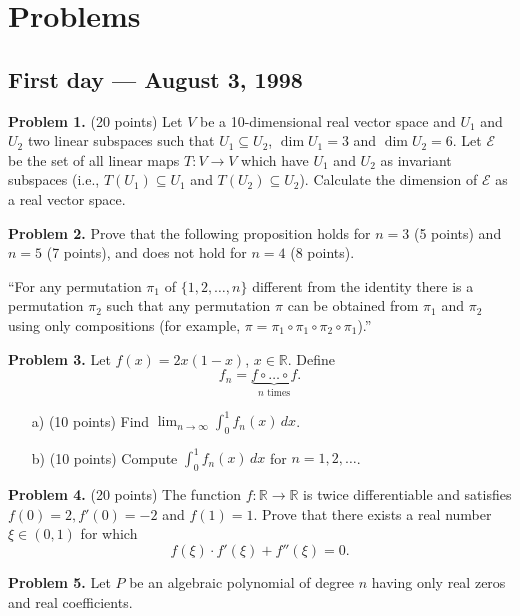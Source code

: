 \documentclass{article}
\begin{document}
\pagestyle{plain}

\section*{Problems}

\subsection*{First day — August 3, 1998}

\textbf{Problem 1.} (20 points)
Let $V$ be a 10-dimensional real vector space and $U_1$ and $U_2$ two linear subspaces
such that $U_1 \subseteq U_2$, $\dim{U_1} = 3$ and $\dim{U_2} = 6$.
Let $\mathcal{E}$ be the set of all linear maps $T : V \rightarrow V$
which have $U_1$ and $U_2$ as invariant subspaces (i.e., $T(U_1) \subseteq U_1$
and $T(U_2) \subseteq U_2$). Calculate the dimension of $\mathcal{E}$ as a real vector space.

\textbf{Problem 2.}
Prove that the following proposition holds for \( n = 3 \) (5 points)
and \( n = 5 \) (7 points), and does not hold for \( n = 4 \) (8 points).

``For any permutation \(\pi_1\) of \(\{1,2,\ldots,n\}\)
different from the identity there is a permutation \(\pi_2\)
such that any permutation \(\pi\) can be obtained from \(\pi_1\) and \(\pi_2\)
using only compositions (for example, \(\pi = \pi_1 \circ \pi_1 \circ \pi_2 \circ \pi_1\)).''

\textbf{Problem 3.} Let \( f(x) = 2x(1 - x) \), \( x \in \mathbb{R} \). Define
\[
f_n = \underbrace{f \circ \ldots \circ f}_{n \text{ times}}.
\]

\begin{enumerate}
    \item[a)] (10 points) Find \(\displaystyle\lim_{n\to\infty} \int_{0}^{1} f_n(x) \, dx\).
    \item[b)] (10 points) Compute \(\int_{0}^{1} f_n(x) \, dx\) for \( n = 1,2,\ldots \).
\end{enumerate}

\textbf{Problem 4.} (20 points) The function \( f : \mathbb{R} \rightarrow \mathbb{R} \) is twice differentiable and satisfies \( f(0) = 2, f'(0) = -2 \) and \( f(1) = 1 \). Prove that there exists a real number \( \xi \in (0, 1) \) for which
\[ f(\xi) \cdot f'(\xi) + f''(\xi) = 0. \]

\textbf{Problem 5.}
Let \( P \) be an algebraic polynomial of degree \( n \) having only real zeros and real coefficients.
\end{document}
